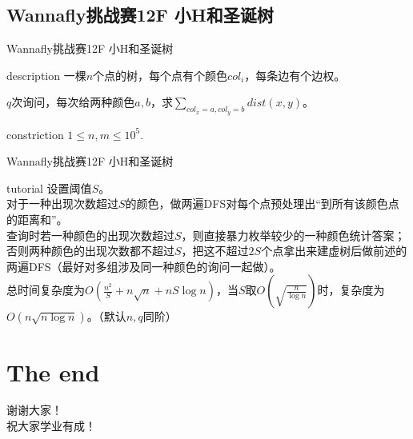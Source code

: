 \documentclass{beamer}
\begin{document}
\subsection{Wannafly挑战赛12F 小H和圣诞树}
\begin{frame}{Wannafly挑战赛12F 小H和圣诞树}
\begin{block}{description}
	一棵$n$个点的树，每个点有个颜色$col_i$，每条边有个边权。
	
	$q$次询问，每次给两种颜色$a,b$，求$\sum_{col_x=a,col_y=b}dist(x,y)$。
\end{block}
\begin{block}{constriction}
	$1 \le n, m \le 10^5.$
\end{block}
\end{frame}
\begin{frame}{Wannafly挑战赛12F 小H和圣诞树}
\begin{block}{tutorial}
	设置阈值$S$。\\
	
	对于一种出现次数超过$S$的颜色，做两遍DFS对每个点预处理出“到所有该颜色点的距离和”。\\
	
	查询时若一种颜色的出现次数超过$S$，则直接暴力枚举较少的一种颜色统计答案；否则两种颜色的出现次数都不超过$S$，把这不超过$2S$个点拿出来建虚树后做前述的两遍DFS（最好对多组涉及同一种颜色的询问一起做）。\\
	
	总时间复杂度为$O(\frac{n^2}{S}+n\sqrt n+nS\log n)$，当$S$取$O(\sqrt{\frac{n}{\log n}})$时，复杂度为$O(n\sqrt{n\log n})$。（默认$n,q$同阶）
\end{block}
\end{frame}


\section{The end}
\begin{frame}
	\begin{center}
		{\huge 谢谢大家！\\  \large 祝大家学业有成！}
	\end{center}
\end{frame}
\end{document}
